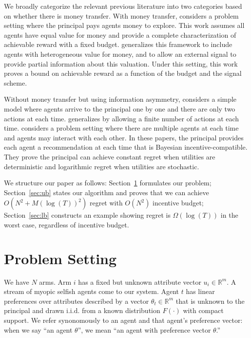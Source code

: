 \documentclass[twoside,11pt]{article}
\begin{document}
We broadly categorize the relevant previous literature into two categories based on whether there is money transfer.
With money transfer, \cite{frazier2014incentivizing} considers a problem setting where the principal pays agents money to explore. This work assumes all agents have equal value for money and provide a complete characterization of achievable reward with a fixed budget. \cite{han2015incentivizing} generalizes this framework to include agents with heterogeneous value for money, and to allow an external signal to provide partial information about this valuation. Under this setting, this work proves a bound on achievable reward as a function of the budget and the signal scheme.

Without money transfer but using information asymmetry, \cite{kremer2014implementing} considers a simple model where agents arrive to the principal one by one and there are only two actions at each time. \cite{mansour2015bayesian} generalizes \cite{kremer2014implementing} by allowing a finite number of actions at each time. \cite{mansour2016bayesian} considers a problem setting where there are multiple agents at each time and agents may interact with each other. In these papers, the principal provides each agent a recommendation at each time that is Bayesian incentive-compatible. They prove the principal can achieve constant regret when utilities are deterministic and logarithmic regret when utilities are stochastic.



We structure our paper as follows: Section~\ref{sec:prob} formulates our problem; Section~\ref{sec:ub} states our algorithm and proves that we can achieve $O(N^2+M(\log(T))^2)$ regret with $O(N^2)$ incentive budget; Section~\ref{sec:lb} constructs an example showing regret is $\Omega(\log(T))$ in the worst case, regardless of incentive budget.



\section{Problem Setting}
\label{sec:prob}

We have $N$ arms. Arm $i$ has a fixed but unknown attribute vector $u_i\in \mathbb{R}^{m}$. 
A stream of myopic selfish agents come to our system.  Agent $t$ has linear preferences over attributes described by a vector $\theta_t \in \mathbb{R}^m$ that is unknown to the principal and drawn i.i.d. from a known distribution $F(\cdot)$ with compact support. We refer synonomously to an agent and that agent's preference vector: when we say ``an agent $\theta$'', we mean ``an agent with preference vector $\theta$.''
\end{document}
